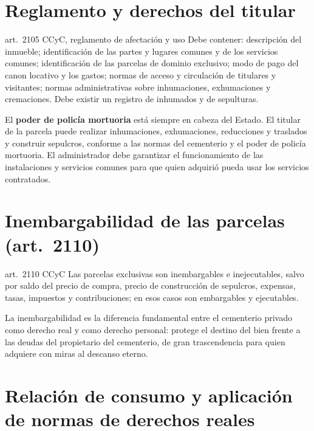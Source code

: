 \documentclass[12pt,oneside]{book}
\begin{document}
\section{Reglamento y derechos del titular}

\begin{regla}{art.~2105 CCyC, reglamento de afectación y uso}
Debe contener: descripción del inmueble; identificación de las partes y lugares comunes y de los servicios comunes; identificación de las parcelas de dominio exclusivo; modo de pago del canon locativo y los gastos; normas de acceso y circulación de titulares y visitantes; normas administrativas sobre inhumaciones, exhumaciones y cremaciones. Debe existir un registro de inhumados y de sepulturas.
\end{regla}

El \textbf{poder de policía mortuoria} está siempre en cabeza del Estado. El titular de la parcela puede realizar inhumaciones, exhumaciones, reducciones y traslados y construir sepulcros, conforme a las normas del cementerio y el poder de policía mortuoria. El administrador debe garantizar el funcionamiento de las instalaciones y servicios comunes para que quien adquirió pueda usar los servicios contratados.

\section{Inembargabilidad de las parcelas (art.~2110)}

\begin{regla}{art.~2110 CCyC}
Las parcelas exclusivas son inembargables e inejecutables, salvo por saldo del precio de compra, precio de construcción de sepulcros, expensas, tasas, impuestos y contribuciones; en esos casos son embargables y ejecutables.
\end{regla}

\begin{importante}
La inembargabilidad es la diferencia fundamental entre el cementerio privado como derecho real y como derecho personal: protege el destino del bien frente a las deudas del propietario del cementerio, de gran trascendencia para quien adquiere con miras al descanso eterno.
\end{importante}

\section{Relación de consumo y aplicación de normas de derechos reales}
\end{document}
